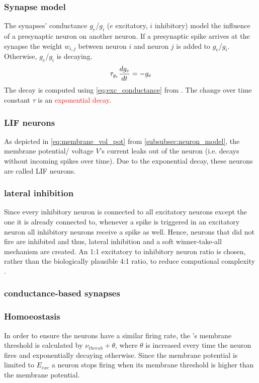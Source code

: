 \subsubsection{Synapse model}
\label{subsubsec:synapse_model}
The synapses' conductance $g_e$/$g_i$ ($e$ excitatory, $i$ inhibitory) model the influence of a presynaptic neuron on another neuron.
If a presynaptic spike arrives at the synapse the weight $w_{i,j}$ between neuron $i$ and neuron $j$ is added to $g_e$/$g_i$.
Otherwise, $g_e$/$g_i$ is decaying.
%
\begin{equation}
    \centering
    \label{eq:exc_conductance}
    \tau_{g_e} \frac{dg_e}{dt} = - g_e
\end{equation}
%
The decay is computed using \autoref{eq:exc_conductance} from \cite{SNN}.
The change over time constant $\tau$ is an \textcolor{red}{exponential decay}.


\subsubsection{\ac{LIF} neurons}
As depicted in \autoref{eq:membrane_vol_pot} from \autoref{subsubsec:neuron_model}, the membrane potential/ voltage $V$'s current leaks out of the neuron 
(i.e. decays without incoming spikes over time).
Due to the exponential decay, these neurons are called \ac{LIF} neurons.


\subsubsection{lateral inhibition}
Since every inhibitory neuron is connected to all excitatory neurons except the one it is already connected to, 
whenever a spike is triggered in an excitatory neuron all inhibitory neurons receive a spike as well.
Hence, neurons that did not fire are inhibited and thus, lateral inhibition and a soft winner-take-all mechanism are created.
An 1:1 excitatory to inhibitory neuron ratio is chosen, rather than the biologically plausible 4:1 ratio, 
to reduce computional complexity \cite{SNN}.





\subsubsection{conductance-based synapses}


\subsubsection{Homoeostasis}
In order to ensure the neurons have a similar firing rate, the \eN{}'s membrane threshold is calculated by $\nu_{thresh} + \theta$, 
where $\theta$ is increased every time the neuron fires and exponentially decaying otherwise.
Since the membrane potential is limited to $E_{exc}$ a neuron stops firing when its membrane threshold is higher than the membrane potential.

